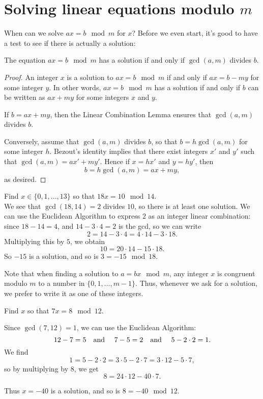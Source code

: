 \documentclass[11pt,dvipsnames]{book}
\numberwithin{figure}{section} %
\numberwithin{table}{section} %
\begin{document}
\section{Solving linear equations modulo $m$}

When can we solve $ax = b\mod m$ for $x$? Before we even start, it's good to have a test to see if there is actually a solution:

\begin{theorem}%
The equation $ax = b\mod m$ has a solution if and only if $\gcd(a,m)$ divides $b$.
\end{theorem}

\begin{proof} An integer $x$ is a solution to $ax = b\mod m$ if and only if $ax=b-my$ for some integer $y$.
In other words, $ax = b\mod m$ has a solution if and only if $b$ can be written as $ax + my$ for some integers $x$ and $y$.

If $b = ax+my$, then the Linear Combination Lemma ensures that $\gcd(a,m)$ divides $b$.

Conversely, assume that $\gcd(a,m)$ divides $b$, so that $b = h\gcd(a,m)$ for some integer $h$.
Bezout's identity implies that there exist integers $x'$ and $y'$ such that $\gcd(a,m)=ax'+my'$.
Hence if $x = hx'$ and $y=hy'$, then
\[
b = h\gcd(a,m) = ax + my,
\]
as desired.
\end{proof}

\begin{example}
Find $x\in \{0,1,...,13\}$ so that $18x = 10\mod 14$. \\

We see that $\gcd(18,14)=2$ divides $10$, so there is at least one solution.
We can use the Euclidean Algorithm to express $2$ as an integer linear combination:
since $18 - 14 = 4$, and $14 - 3\cdot 4 = 2$ is the gcd, so we can write
\[
2 = 14 - 3\cdot 4 = 4\cdot 14 - 3 \cdot 18.
\]
Multiplying this by $5$, we obtain
\[
10 = 20\cdot 14 - 15 \cdot 18.
\]
So $-15$ is a solution, and so is $3 = -15 \mod 18$.
\end{example}

Note that when finding a solution to $a = bx\mod m$, any integer $x$ is congruent modulo $m$ to a number in $\{0,1,...,m-1\}$. Thus, whenever we ask for a solution, we prefer to write it as one of these integers.

\begin{exercise}
Find $x$ so that $7x = 8\mod 12$. \\
\begin{solution}
Since $\gcd(7,12)=1$, we can use the Euclidean Algorithm:
\[
12-7 = 5 \text{\quad and \quad} 7-5 = 2 \text{\quad and \quad} 5-2\cdot 2 = 1.
\]
We find
\[
1 = 5 - 2\cdot 2 = 3\cdot 5 - 2\cdot 7 = 3\cdot 12 - 5\cdot 7,
\]
so by multiplying by $8$, we get
\[
8 = 24 \cdot 12 - 40 \cdot 7.
\]

Thus $x = -40$ is a solution, and so is $8 = -40 \mod 12$.
\end{solution}
\end{exercise}
\end{document}
